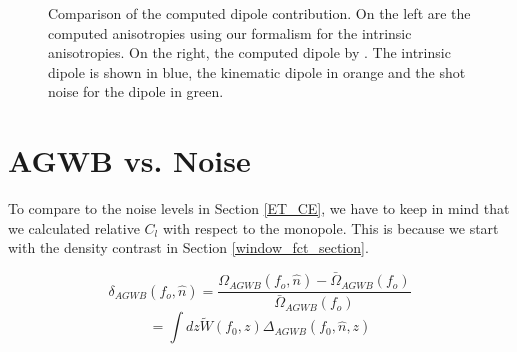 \begin{figure}
    \centering
    \caption[Comparison of the computed dipole contribution to \cite{dallarmi_dipole_2022}.]{Comparison of the computed dipole contribution. On the left are the computed anisotropies using our formalism for the intrinsic anisotropies. On the right, the computed dipole by \cite{dallarmi_dipole_2022}. The intrinsic dipole is shown in blue, the kinematic dipole in orange and the shot noise for the dipole in green.}
    \label{lorenzo_comparison}
\end{figure} 


\section{AGWB vs. Noise}

To compare to the noise levels in Section \ref{ET_CE}, we have to keep in mind that we calculated relative $C_l$ with respect to the monopole. This is because we start with the density contrast in Section \ref{window_fct_section}.

\begin{equation}
    \delta_{AGWB}(f_o, \hat{n})=\frac{\Omega_{AGWB}(f_o, \hat{n})-\bar{\Omega}_{AGWB}(f_o)}{\bar{\Omega}_{AGWB}(f_o)}
\end{equation}
\begin{equation}
    =\int dz \tilde{W}(f_0, z)\Delta_{AGWB}(f_0, \hat{n}, z)
\end{equation}

